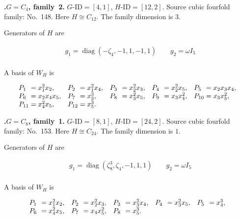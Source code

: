 \documentclass[12pt]{amsart}
\makeatletter
\numberwithin{equation}{section}
\theoremstyle{plain}
\theoremstyle{definition}
\theoremstyle{remark}
\DeclareMathOperator{\diag}{diag}
\newcommand{\PBasisLabel}[1]{\mathrlap{P_{#1}}\phantom{P_{99}}}
\newenvironment{SecEightAlignedBasis}[1]{%
  \begingroup\renewcommand{\arraystretch}{1.18}%
  \[\begin{array}{@{}#1@{}}%
}{\end{array}\]\endgroup}
\newenvironment{familydisplay}{%
  \begingroup
  \setlength{\arraycolsep}{1.35pt}%
  \renewcommand{\arraystretch}{0.96}%
  \setlength{\jot}{2pt}%
}{\endgroup}
\makeatother
\begin{document}
\par{}\medskip\noindent\textbf{.\enspace $G=C_4$, family~2.}\label{fam:threefold-no-37}
$G\text{-ID}=[4,1]$, $H\text{-ID}=[12,2]$.
Source cubic fourfold family: No.~148.  Here
$H\cong C_{12}$.
The family dimension is $3$.
\par\smallskip\noindent Generators of $H$ are\par\nopagebreak
\begin{familydisplay}
\begin{align*}
&g_{1}=\diag(-\zeta_4,-1,1,-1,1)
\qquad g_{2}=\omega I_5\\
\end{align*}
\end{familydisplay}
\par\smallskip\noindent A basis of $W_H$ is\par\nopagebreak
\begin{familydisplay}
\begin{SecEightAlignedBasis}{l@{\quad}l@{\quad}l@{\quad}l@{\quad}l}
\PBasisLabel{1}=x_{1}^{2}x_{2}, & \PBasisLabel{2}=x_{1}^{2}x_{4}, & \PBasisLabel{3}=x_{2}^{2}x_{3}, & \PBasisLabel{4}=x_{2}^{2}x_{5}, & \PBasisLabel{5}=x_{2}x_{3}x_{4},\\
\PBasisLabel{6}=x_{2}x_{4}x_{5}, & \PBasisLabel{7}=x_{3}^{3}, & \PBasisLabel{8}=x_{3}^{2}x_{5}, & \PBasisLabel{9}=x_{3}x_{4}^{2}, & \PBasisLabel{10}=x_{3}x_{5}^{2},\\
\PBasisLabel{11}=x_{4}^{2}x_{5}, & \multicolumn{4}{@{}l@{}}{\PBasisLabel{12}=x_{5}^{3}.}
\end{SecEightAlignedBasis}
\end{familydisplay}

\par{}\medskip\noindent\textbf{.\enspace $G=C_8$, family~1.}\label{fam:threefold-no-38}
$G\text{-ID}=[8,1]$, $H\text{-ID}=[24,2]$.
Source cubic fourfold family: No.~153.  Here
$H\cong C_{24}$.
The family dimension is $1$.
\par\smallskip\noindent Generators of $H$ are\par\nopagebreak
\begin{familydisplay}
\begin{align*}
&g_{1}=\diag(\zeta_8^3,\zeta_4,-1,1,1)
\qquad g_{2}=\omega I_5\\
\end{align*}
\end{familydisplay}
\par\smallskip\noindent A basis of $W_H$ is\par\nopagebreak
\begin{familydisplay}
\begin{SecEightAlignedBasis}{l@{\quad}l@{\quad}l@{\quad}l@{\quad}l}
\PBasisLabel{1}=x_{1}^{2}x_{2}, & \PBasisLabel{2}=x_{2}^{2}x_{3}, & \PBasisLabel{3}=x_{3}^{2}x_{4}, & \PBasisLabel{4}=x_{3}^{2}x_{5}, & \PBasisLabel{5}=x_{4}^{3},\\
\PBasisLabel{6}=x_{4}^{2}x_{5}, & \PBasisLabel{7}=x_{4}x_{5}^{2}, & \multicolumn{3}{@{}l@{}}{\PBasisLabel{8}=x_{5}^{3}.}
\end{SecEightAlignedBasis}
\end{familydisplay}
\end{document}
